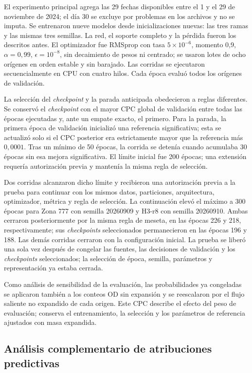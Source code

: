 El experimento principal agrega las 29 fechas disponibles entre el 1 y el 29 de noviembre de 2024; el día 30 se excluye por problemas en los archivos y no se imputa. Se entrenaron nueve modelos desde inicializaciones nuevas: las tres ramas y las mismas tres semillas. La red, el soporte completo y la pérdida fueron los descritos antes. El optimizador fue RMSprop con tasa $5\times10^{-6}$, momento 0,9, $\alpha=0{,}99$, $\epsilon=10^{-8}$, sin decaimiento de pesos ni centrado; se usaron lotes de ocho orígenes en orden estable y sin barajado. Las corridas se ejecutaron secuencialmente en CPU con cuatro hilos. Cada época evaluó todos los orígenes de validación.

La selección del \textit{checkpoint} y la parada anticipada obedecieron a reglas diferentes. Se conservó el \textit{checkpoint} con el mayor CPC global de validación entre todas las épocas ejecutadas y, ante un empate exacto, el primero. Para la parada, la primera época de validación inicializó una referencia significativa; esta se actualizó solo si el CPC posterior era estrictamente mayor que la referencia más $0{,}0001$. Tras un mínimo de 50 épocas, la corrida se detenía cuando acumulaba 30 épocas sin esa mejora significativa. El límite inicial fue 200 épocas; una extensión requería autorización previa y mantenía la misma regla de selección.

Dos corridas alcanzaron dicho límite y recibieron una autorización previa a la prueba para continuar con los mismos datos, particiones, arquitectura, optimizador, métrica y regla de selección. La continuación elevó el máximo a 300 épocas para Zona 777 con semilla 20260909 y H3-r8 con semilla 20260910. Ambas cerraron posteriormente por la misma regla de meseta, en las épocas 226 y 218, respectivamente; sus \textit{checkpoints} seleccionados permanecieron en las épocas 196 y 188. Las demás corridas cerraron con la configuración inicial. La prueba se liberó una sola vez después de congelar las fuentes, las decisiones de validación y los \textit{checkpoints} seleccionados; la selección de época, semilla, parámetros y representación ya estaba cerrada.

Como análisis de sensibilidad de la evaluación, las probabilidades ya congeladas se aplicaron también a los conteos OD sin expansión y se reescalaron por el flujo saliente no expandido de cada origen. Este CPC describe el efecto del peso de evaluación; conserva el entrenamiento, la selección y los parámetros de referencia ajustados con masa expandida.

\subsection{Análisis complementario de atribuciones predictivas}

